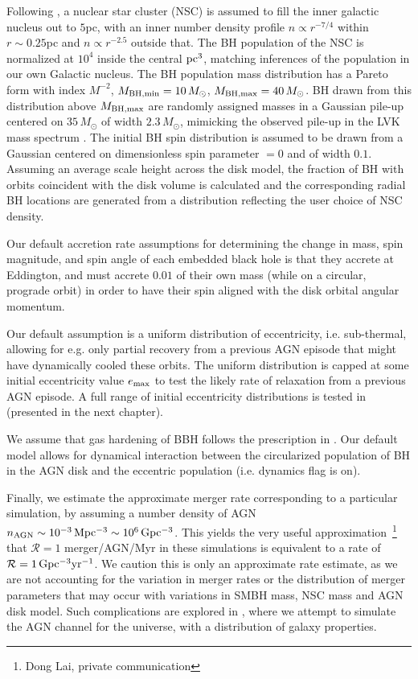 Following \citet{Generozov+18}, a nuclear star cluster (NSC) is assumed to fill the inner galactic nucleus out to $5$pc, with an inner number density profile $n\propto r^{-7/4}$ within $r\sim 0.25$pc and $n \propto r^{-2.5}$ outside that. The BH population of the NSC is normalized at $10^{4}$ inside the central ${\rm pc}^{3}$, matching inferences of the population in our own Galactic nucleus. The BH population mass distribution has a Pareto form with index $M^{-2}$, $M_{\rm BH, min}=10\,M_{\odot}$, $M_{\rm BH,max}=40\,M_{\odot}$. BH drawn from this distribution above $M_{\rm BH,max}$ are randomly assigned masses in a Gaussian pile-up centered on $35\,M_{\odot}$ of width $2.3\,M_{\odot}$, mimicking the observed pile-up in the LVK mass spectrum \citep{Abbott+23-massbump}. The initial BH spin distribution is assumed to be drawn from a Gaussian centered on dimensionless spin parameter $=0$ and of width $0.1$. Assuming an average scale height across the \citet{SirkoGoodman03} disk model, the fraction of BH with orbits coincident with the disk volume is calculated and the corresponding radial BH locations are generated from a distribution reflecting the user choice of NSC density.


Our default accretion rate assumptions for determining the change in mass, spin magnitude, and spin angle of each embedded black hole is that they accrete at Eddington, and must accrete $0.01$ of their own mass (while on a circular, prograde orbit) in order to have their spin aligned with the disk orbital angular momentum.
 
Our default assumption is a uniform distribution of eccentricity, i.e. sub-thermal, allowing for e.g. only partial recovery from a previous AGN episode that might have dynamically cooled these orbits. The uniform distribution is capped at some initial eccentricity value $e_{\rm max}$ to test the likely rate of relaxation from a previous AGN episode.
A full range of initial eccentricity distributions is tested in \citet{Cook+25} (presented in the next chapter).

 We assume that gas hardening of BBH follows the prescription in \citet{Baruteau11}. Our default model allows for dynamical interaction between the circularized population of BH in the AGN disk and the eccentric population (i.e. dynamics flag is on). 

Finally, we estimate the approximate merger rate corresponding to a particular simulation, by assuming a number density of AGN $n_{\rm AGN} \sim 10^{-3} \,{\rm Mpc^{-3}} \sim 10^{6} \,{\rm Gpc^{-3}}$. This yields the very useful approximation~\footnote{ Dong Lai, private communication} that $\mathcal{R}=1$ merger/AGN/Myr in these simulations is equivalent to a rate of $\mathcal{R}=1\,{\rm Gpc^{-3} yr^{-1}}$. We caution this is only an approximate rate estimate, as we are not accounting for the variation in merger rates or the distribution of merger parameters that may occur with variations in SMBH mass, NSC mass and AGN disk model. Such complications are explored in \citet{Delfavero+25-mcfactsIII}, where we attempt to simulate the AGN channel for the universe, with a distribution of galaxy properties.


